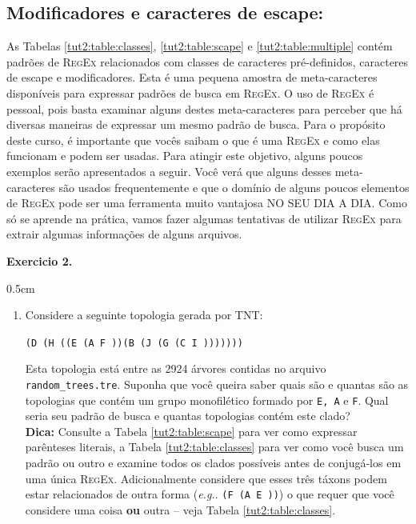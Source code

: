\begin{refsection}
\subsection{Modificadores e caracteres de escape:}\label{tut2:regex:modifiers}

As Tabelas \ref{tut2:table:classes}, \ref{tut2:table:scape} e \ref{tut2:table:multiple} contém padrões de \textsc{RegEx} relacionados com classes de caracteres pré-definidos, caracteres de escape e modificadores. Esta é uma pequena amostra de meta-caracteres disponíveis para expressar padrões de busca em \textsc{RegEx}. O uso de \textsc{RegEx} é pessoal, pois basta examinar alguns destes meta-caracteres para perceber que há diversas maneiras de expressar um mesmo padrão de busca. Para o propósito deste curso, é importante que vocês saibam o que é uma \textsc{RegEx} e como elas funcionam e podem ser usadas. Para atingir este objetivo, alguns poucos exemplos serão apresentados a seguir. Você verá que alguns desses meta-caracteres são usados frequentemente e que o domínio de alguns poucos elementos de \textsc{RegEx} pode ser uma ferramenta muito vantajosa NO SEU DIA A DIA. Como só se aprende na prática, vamos fazer algumas tentativas de utilizar \textsc{RegEx} para extrair algumas informações de alguns arquivos.\\

\begin{blackBlock}{\textbf{Exercicio 2.}}\label{tut2:ex:2.\arabic{ex}}
\begin {myindentpar}{0.5cm}
\begin{enumerate}[\itshape i.]
 \item{Considere a seguinte topologia gerada por TNT:}\label{tut2:regex:modifiers:ex1}\\

\begin{center}
\texttt{(D (H ((E (A F ))(B (J (G (C I )))))))}\\
\end{center}

	Esta topologia está entre as 2924 árvores contidas no arquivo \texttt{random\_trees.tre}. Suponha que você queira saber quais são e quantas são as topologias que contém um grupo monofilético formado por \texttt{E, A} e \texttt{F}. Qual seria seu padrão de busca e quantas topologias contém este clado?\\
\textbf{Dica:} Consulte a Tabela \ref{tut2:table:scape} para ver como expressar parênteses literais, a Tabela \ref{tut2:table:classes} para ver como você busca um padrão ou outro e examine todos os clados possíveis antes de conjugá-los em uma única \textsc{RegEx}. Adicionalmente considere que esses três táxons podem estar relacionados de outra forma (\textit{e.g.}. \texttt{(F (A E ))}) o que requer que você considere uma coisa \textbf{ou} outra -- veja Tabela \ref{tut2:table:classes}.\\


\end{enumerate}
\end{myindentpar}
\end{blackBlock}
\end{refsection}
